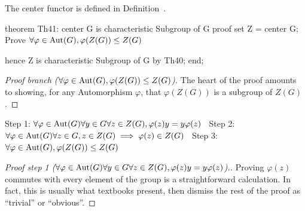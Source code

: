 \begin{thm-remark}
The {\Tt{}center\nwendquote} functor is defined in
Definition~.
\end{thm-remark}

\nwenddocs{}\endmoddef\nwstartdeflinemarkup{}\nwenddeflinemarkup

theorem Th41:
  center G is characteristic Subgroup of G
proof
  set Z = center G;
  \LA{}Prove $\forall\varphi\in\operatorname{Aut}(G),\varphi(Z(G))\leq Z(G)$~{\nwtagstyle{}}\RA{}

  hence Z is characteristic Subgroup of G by Th40;
end;
\eatline
{}\nwendcode{}\nwdocspar
\begin{proof}[Proof branch ($\forall\varphi\in\operatorname{Aut}(G),\varphi(Z(G))\leq Z(G)$)]
The heart of the proof amounts to showing, for any Automorphism
$\varphi$, that $\varphi(Z(G))$ is a subgroup of $Z(G)$.
\end{proof}

\nwenddocs{}\endmoddef\nwstartdeflinemarkup{}\nwenddeflinemarkup
\LA{}Step 1: $\forall\varphi\in\operatorname{Aut}(G)\forall y\in G\forall z\in Z(G), \varphi(z)y = y\varphi(z)$~{\nwtagstyle{}}\RA{}
\LA{}Step 2: $\forall\varphi\in\operatorname{Aut}(G)\forall z\in G, z\in Z(G)\implies \varphi(z)\in Z(G)$~{\nwtagstyle{}}\RA{}
\LA{}Step 3: $\forall\varphi\in\operatorname{Aut}(G),\varphi(Z(G))\leq Z(G)$~{\nwtagstyle{}}\RA{}
\nwendcode{}\nwdocspar

\begin{proof}[Proof step 1 ($\forall\varphi\in\operatorname{Aut}(G)\forall y\in G\forall z\in Z(G), \varphi(z)y = y\varphi(z)$).]
Proving $\varphi(z)$ commutes with every element of the group is a
straightforward calculation. In fact, this is usually what textbooks
present, then dismiss the rest of the proof as ``trivial'' or
``obvious''.
\end{proof}



